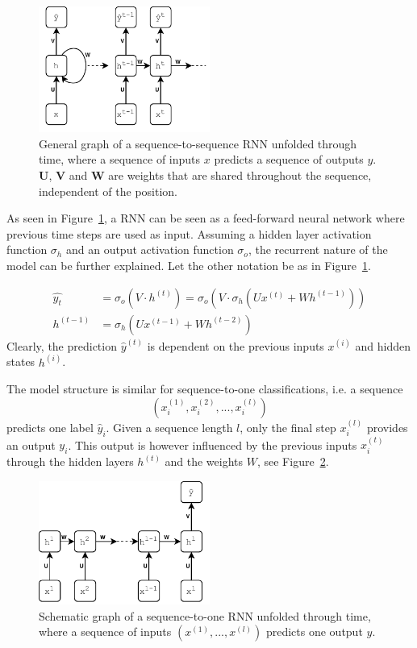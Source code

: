 \begin{figure}[t]
    \centering
    \includegraphics[width=0.5\textwidth]{Figures/figs-simplernn.pdf}
    \caption{General graph of a sequence-to-sequence RNN unfolded through time, where a sequence of inputs $x$ predicts a sequence of outputs $y$. $\mathbf{U}$, $\mathbf{V}$ and $\mathbf{W}$ are weights that are shared throughout the sequence, independent of the position.}
    \label{fig:rnn}
\end{figure}

As seen in Figure~\ref{fig:rnn}, a RNN can be seen as a feed-forward neural network where previous time steps are used as input. Assuming a hidden layer activation function $\sigma_h$ and an output activation function $\sigma_o$, the recurrent nature of the model can be further explained. Let the other notation be as in Figure~\ref{fig:rnn}. 

\begin{align}
    \hat{y_t} &= \sigma_o(V \cdot h^{(t)}) = \sigma_o(V \cdot  \sigma_h(U x^{(t)} + W h^{(t-1)})) \\
    h^{(t-1)} &= \sigma_h(Ux^{(t-1)} + W h^{(t-2)})
\end{align}
Clearly, the prediction $\hat{y}^{(t)}$ is dependent on the previous inputs $x^{(i)}$ and hidden states $h^{(i)}$. 

The model structure is similar for sequence-to-one classifications, i.e. a sequence
\[
(x_i^{(1)}, x_i^{(2)}, ..., x_i^{(l)})
\]
predicts one label $\hat{y}_i$. Given a sequence length $l$, only the final step $x_i^{(l)}$ provides an output $y_i$. This output is however influenced by the previous inputs $x_i^{(t)}$ through the hidden layers $h^{(t)}$ and the weights $W$, see Figure~\ref{fig:rnns2o}. 


\begin{figure}[t]
    \centering
    \includegraphics[width=0.5\textwidth]{Figures/figs-rnn-s2o.pdf}
    \caption{Schematic graph of a sequence-to-one RNN unfolded through time, where a sequence of inputs $(x^{(1)}, ..., x^{(l)})$ predicts one output $y$.}
    \label{fig:rnns2o}
\end{figure}

